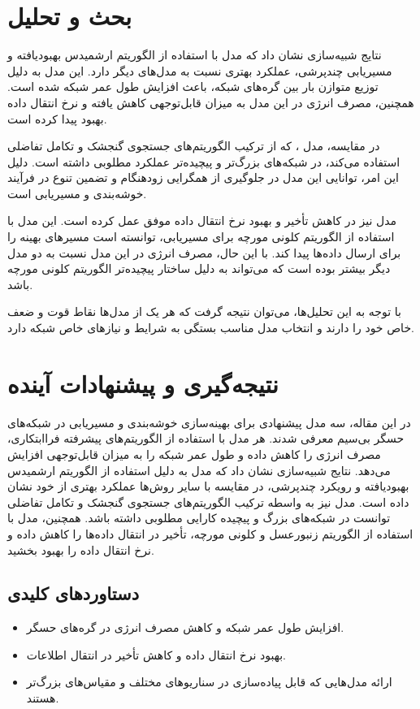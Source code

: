 \documentclass[12pt, onecolumn, a4paper]{article}
\begin{document}
\section{بحث و تحلیل}

نتایج شبیه‌سازی نشان داد که مدل  با استفاده از الگوریتم ارشمیدس بهبودیافته و مسیریابی چندپرشی، عملکرد بهتری نسبت به مدل‌های دیگر دارد. این مدل به دلیل توزیع متوازن بار بین گره‌های شبکه، باعث افزایش طول عمر شبکه شده است. همچنین، مصرف انرژی در این مدل به میزان قابل‌توجهی کاهش یافته و نرخ انتقال داده بهبود پیدا کرده است. 

در مقایسه، مدل ، که از ترکیب الگوریتم‌های جستجوی گنجشک و تکامل تفاضلی استفاده می‌کند، در شبکه‌های بزرگ‌تر و پیچیده‌تر عملکرد مطلوبی داشته است. دلیل این امر، توانایی این مدل در جلوگیری از همگرایی زودهنگام و تضمین تنوع در فرآیند خوشه‌بندی و مسیریابی است. 

مدل  نیز در کاهش تأخیر و بهبود نرخ انتقال داده موفق عمل کرده است. این مدل با استفاده از الگوریتم کلونی مورچه برای مسیریابی، توانسته است مسیرهای بهینه را برای ارسال داده‌ها پیدا کند. با این حال، مصرف انرژی در این مدل نسبت به دو مدل دیگر بیشتر بوده است که می‌تواند به دلیل ساختار پیچیده‌تر الگوریتم کلونی مورچه باشد.

با توجه به این تحلیل‌ها، می‌توان نتیجه گرفت که هر یک از مدل‌ها نقاط قوت و ضعف خاص خود را دارند و انتخاب مدل مناسب بستگی به شرایط و نیازهای خاص شبکه دارد.

\section{نتیجه‌گیری و پیشنهادات آینده}

در این مقاله، سه مدل پیشنهادی برای بهینه‌سازی خوشه‌بندی و مسیریابی در شبکه‌های حسگر بی‌سیم معرفی شدند. هر مدل با استفاده از الگوریتم‌های پیشرفته فراابتکاری، مصرف انرژی را کاهش داده و طول عمر شبکه را به میزان قابل‌توجهی افزایش می‌دهد. نتایج شبیه‌سازی نشان داد که مدل  به دلیل استفاده از الگوریتم ارشمیدس بهبودیافته و رویکرد چندپرشی، در مقایسه با سایر روش‌ها عملکرد بهتری از خود نشان داده است. مدل  نیز به واسطه ترکیب الگوریتم‌های جستجوی گنجشک و تکامل تفاضلی توانست در شبکه‌های بزرگ و پیچیده کارایی مطلوبی داشته باشد. همچنین، مدل  با استفاده از الگوریتم زنبورعسل و کلونی مورچه، تأخیر در انتقال داده‌ها را کاهش داده و نرخ انتقال داده را بهبود بخشید.

\subsection*{دستاوردهای کلیدی}
\begin{itemize}
	\item افزایش طول عمر شبکه و کاهش مصرف انرژی در گره‌های حسگر.
	\item بهبود نرخ انتقال داده و کاهش تأخیر در انتقال اطلاعات.
	\item ارائه مدل‌هایی که قابل پیاده‌سازی در سناریوهای مختلف و مقیاس‌های بزرگ‌تر هستند.
\end{itemize}
\end{document}
